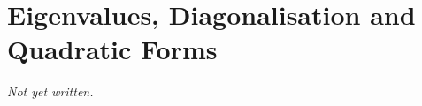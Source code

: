 \chapter{Eigenvalues, Diagonalisation and Quadratic Forms}\label{ch:eigenvalues-diagonalisation}


\textit{Not yet written.}

